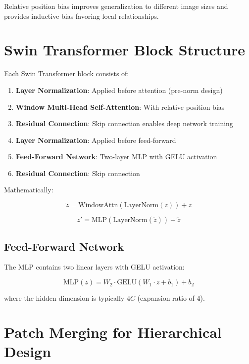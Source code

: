 Relative position bias improves generalization to different image sizes and provides inductive bias favoring local relationships.

\section{Swin Transformer Block Structure}

Each Swin Transformer block consists of:

\begin{enumerate}
    \item \textbf{Layer Normalization}: Applied before attention (pre-norm design)
    \item \textbf{Window Multi-Head Self-Attention}: With relative position bias
    \item \textbf{Residual Connection}: Skip connection enables deep network training
    \item \textbf{Layer Normalization}: Applied before feed-forward
    \item \textbf{Feed-Forward Network}: Two-layer MLP with GELU activation
    \item \textbf{Residual Connection}: Skip connection
\end{enumerate}

Mathematically:

\begin{equation}
\tilde{z} = \text{WindowAttn}(\text{LayerNorm}(z)) + z
\end{equation}

\begin{equation}
z' = \text{MLP}(\text{LayerNorm}(\tilde{z})) + \tilde{z}
\end{equation}

\subsection{Feed-Forward Network}

The MLP contains two linear layers with GELU activation:

\begin{equation}
\text{MLP}(z) = W_2 \cdot \text{GELU}(W_1 \cdot z + b_1) + b_2
\end{equation}

where the hidden dimension is typically $4C$ (expansion ratio of 4).

\section{Patch Merging for Hierarchical Design}

